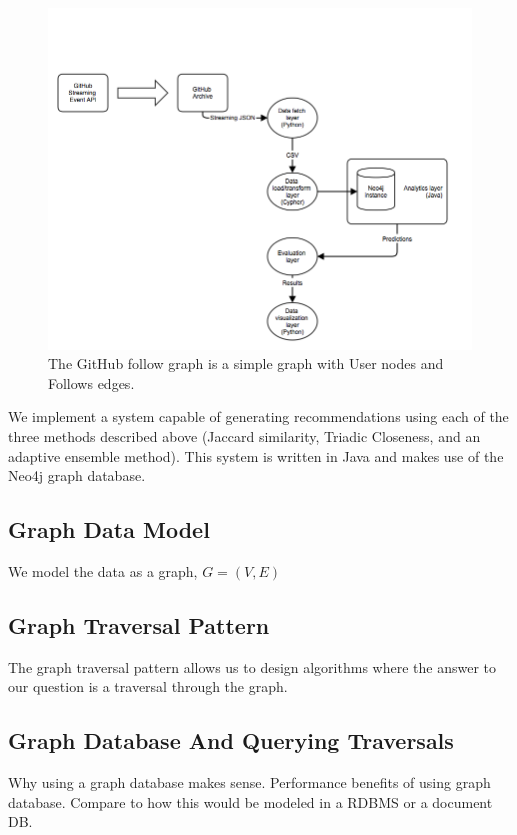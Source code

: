 \begin{figure}[ht]
\vskip 0.2in
\begin{center}
\centerline{\includegraphics[width=0.75\columnwidth]{images/thesis_architecture.png}}
\caption[Link prediction system architecture]{The GitHub follow graph is a simple graph with User nodes and Follows edges.}
\label{github_simplified_data_model}
\end{center}
\vskip -0.2in
\end{figure} 


We implement a system capable of generating recommendations using each of the three methods described above (Jaccard similarity, Triadic Closeness, and an adaptive ensemble method). This system is written in Java and makes use of the Neo4j graph database.

\subsection{Graph Data Model}
We model the data as a graph, $G = (V, E)$ 

\subsection{Graph Traversal Pattern}
The graph traversal pattern allows us to design algorithms where the answer to our question is a traversal through the graph. 

\subsection{Graph Database And Querying Traversals}
Why using a graph database makes sense.
Performance benefits of using graph database.
Compare to how this would be modeled in a RDBMS or a document DB.

